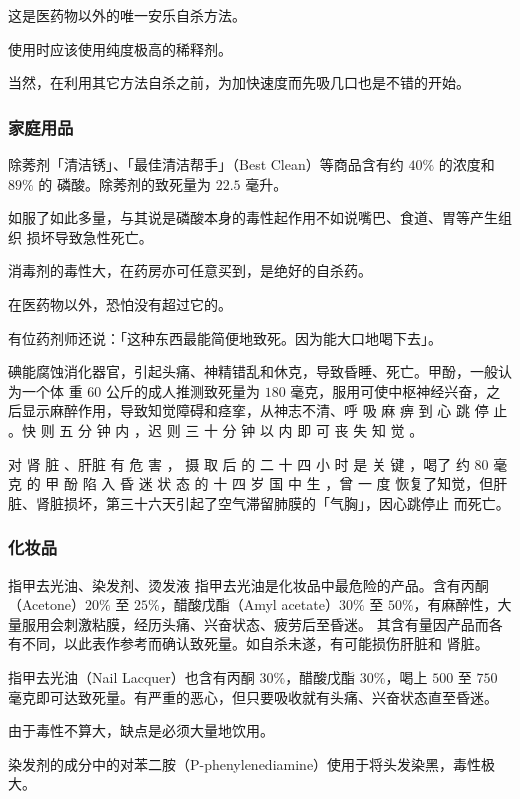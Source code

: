 \documentclass[UTF8]{ctexart}
\begin{document}
这是医药物以外的唯一安乐自杀方法。

使用时应该使用纯度极高的稀释剂。

当然，在利用其它方法自杀之前，为加快速度而先吸几口也是不错的开始。

\subsubsection{家庭用品}

除莠剂「清洁锈」、「最佳清洁帮手」（Best Clean）等商品含有约 $40\%$ 的浓度和 $89\%$ 的
磷酸。除莠剂的致死量为 $22.5$ 毫升。

如服了如此多量，与其说是磷酸本身的毒性起作用不如说嘴巴、食道、胃等产生组织
损坏导致急性死亡。

消毒剂的毒性大，在药房亦可任意买到，是绝好的自杀药。

在医药物以外，恐怕没有超过它的。

有位药剂师还说：「这种东西最能简便地致死。因为能大口地喝下去」。

碘能腐蚀消化器官，引起头痛、神精错乱和休克，导致昏睡、死亡。甲酚，一般认为一个体
重 $60$ 公斤的成人推测致死量为 $180$ 毫克，服用可使中枢神经兴奋，之后显示麻醉作用，导致知觉障碍和痉挛，从神志不清、呼
吸 麻 痹 到 心 跳 停 止 。快 则 五 分 钟 内 ，迟 则 三 十 分 钟 以 内 即 可 丧 失 知 觉 。

对 肾 脏 、肝脏 有 危 害 ， 摄 取 后 的 二 十 四 小 时 是 关 键 ，喝了 约 $80$ 毫 克 的 甲 酚 陷 入 昏 迷 状 态 的 十 四 岁 国 中 生 ，曾 一 度 恢复了知觉，但肝脏、肾脏损坏，第三十六天引起了空气滞留肺膜的「气胸」，因心跳停止 而死亡。

\subsubsection{化妆品}

指甲去光油、染发剂、烫发液
指甲去光油是化妆品中最危险的产品。含有丙酮（Acetone）$20\%$ 至 $25\%$，醋酸戊酯（Amyl
acetate）$30\%$ 至 $50\%$，有麻醉性，大量服用会刺激粘膜，经历头痛、兴奋状态、疲劳后至昏迷。
其含有量因产品而各有不同，以此表作参考而确认致死量。如自杀未遂，有可能损伤肝脏和
肾脏。

指甲去光油（Nail Lacquer）也含有丙酮 $30\%$，醋酸戊酯 $30\%$，喝上 $500$ 至 $750$
毫克即可达致死量。有严重的恶心，但只要吸收就有头痛、兴奋状态直至昏迷。

由于毒性不算大，缺点是必须大量地饮用。

染发剂的成分中的对苯二胺（P-phenylenediamine）使用于将头发染黑，毒性极大。
\end{document}
